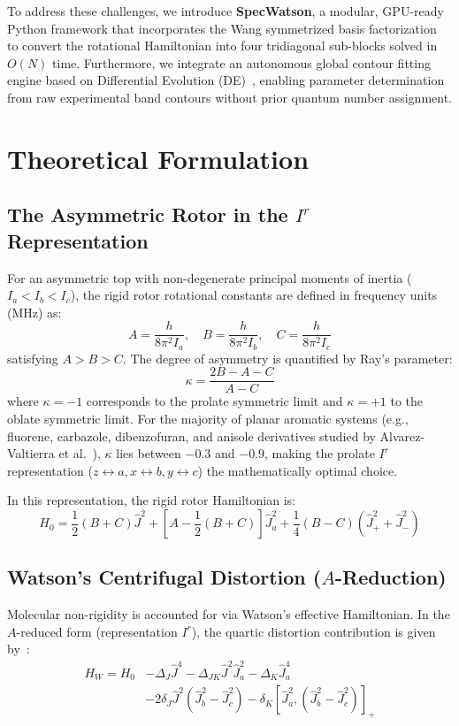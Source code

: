 \documentclass[aps,jcp,reprint,twocolumn,superscriptaddress,showpacs,amsmath,amssymb]{revtex4-2}
\begin{document}
To address these challenges, we introduce \textbf{SpecWatson}, a modular, GPU-ready Python framework that incorporates the Wang symmetrized basis factorization~\cite{wang1929degree} to convert the rotational Hamiltonian into four tridiagonal sub-blocks solved in $O(N)$ time. Furthermore, we integrate an autonomous global contour fitting engine based on Differential Evolution (DE)~\cite{storn1997differential}, enabling parameter determination from raw experimental band contours without prior quantum number assignment.

\section{Theoretical Formulation}

\subsection{The Asymmetric Rotor in the $I^r$ Representation}
For an asymmetric top with non-degenerate principal moments of inertia ($I_a < I_b < I_c$), the rigid rotor rotational constants are defined in frequency units (MHz) as:
\begin{equation}
A = \frac{h}{8\pi^2 I_a}, \quad B = \frac{h}{8\pi^2 I_b}, \quad C = \frac{h}{8\pi^2 I_c}
\end{equation}
satisfying $A > B > C$. The degree of asymmetry is quantified by Ray's parameter:
\begin{equation}
\kappa = \frac{2B - A - C}{A - C}
\end{equation}
where $\kappa = -1$ corresponds to the prolate symmetric limit and $\kappa = +1$ to the oblate symmetric limit. For the majority of planar aromatic systems (e.g., fluorene, carbazole, dibenzofuran, and anisole derivatives studied by Alvarez-Valtierra et al.~\cite{alvarez2006rotationally,alvarez2010high}), $\kappa$ lies between $-0.3$ and $-0.9$, making the prolate $I^r$ representation ($z \leftrightarrow a, x \leftrightarrow b, y \leftrightarrow c$) the mathematically optimal choice.

In this representation, the rigid rotor Hamiltonian is:
\begin{equation}
H_0 = \frac{1}{2}(B + C)\hat{J}^2 + \left[A - \frac{1}{2}(B + C)\right]\hat{J}_a^2 + \frac{1}{4}(B - C)(\hat{J}_+^2 + \hat{J}_-^2)
\end{equation}

\subsection{Watson's Centrifugal Distortion ($A$-Reduction)}
Molecular non-rigidity is accounted for via Watson's effective Hamiltonian. In the $A$-reduced form (representation $I^r$), the quartic distortion contribution is given by~\cite{watson1977aspects}:
\begin{align}
H_W = H_0 &- \Delta_J \hat{J}^4 - \Delta_{JK} \hat{J}^2 \hat{J}_a^2 - \Delta_K \hat{J}_a^4 \nonumber \\
&- 2\delta_J \hat{J}^2 (\hat{J}_b^2 - \hat{J}_c^2) - \delta_K [\hat{J}_a^2, (\hat{J}_b^2 - \hat{J}_c^2)]_+
\end{align}
\end{document}
